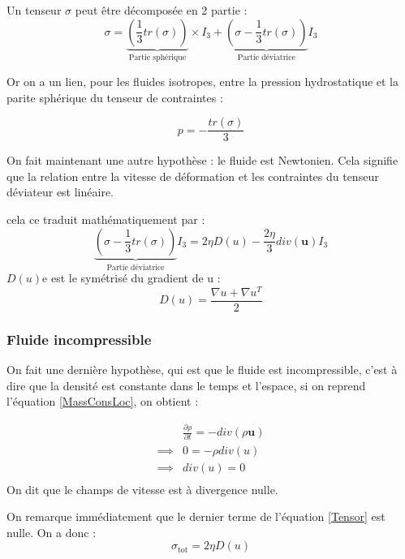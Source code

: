 Un tenseur $\sigma$ peut être décomposée en 2 partie : 
\begin{equation}
\sigma = \underbrace{\left(\frac{1}{3} tr(\sigma)\right)}_{\text{Partie sphérique}}\times I_3+ \underbrace{\left(\sigma -  \frac{1}{3} tr(\sigma) \right)}_{\text{Partie déviatrice}}I_3
\end{equation}

Or on a un lien, pour les fluides isotropes, entre la pression hydrostatique et la parite sphérique du tenseur de contraintes : 

\begin{equation}
p = -\frac{tr(\sigma)}{3}
\end{equation}

On fait maintenant une autre hypothèse : le fluide est Newtonien. Cela signifie que la relation entre la vitesse de déformation et les contraintes du tenseur déviateur est linéaire.

cela ce traduit mathématiquement par : 
\begin{equation}\label{Tensor}
\underbrace{\left(\sigma -  \frac{1}{3} tr(\sigma) \right)}_{\text{Partie déviatrice}}I_3 = 2 \eta D(u) - \frac{2 \eta}{3}div(\mathbf{u})I_3
\end{equation}
$D(u)$e est le symétrisé du gradient de u : 
\begin{equation}
D(u) = \frac{\nabla u + \nabla u^T}{2}
\end{equation}

\subsubsection{Fluide incompressible}
On fait une dernière hypothèse, qui est que le fluide est incompressible, c'est à dire que la densité est constante dans le temps et l'espace, si on reprend l'équation \ref{MassConsLoc}, on obtient : 

\begin{equation}\label{Divnul}
\begin{aligned}
&\frac{\partial\rho}{\partial t} = -div(\rho \mathbf{u})  \\
\implies  & 0 = - \rho div(u) \\
\implies  & div(u) = 0 \\
\end{aligned}
\end{equation}
On dit que le champs de vitesse est à divergence nulle.

On remarque immédiatement que le dernier terme de l'équation \ref{Tensor} est nulle.
On a donc : 
\begin{equation}
\sigma_{\mathrm{tot}} = 2\eta D(u)
\end{equation}

